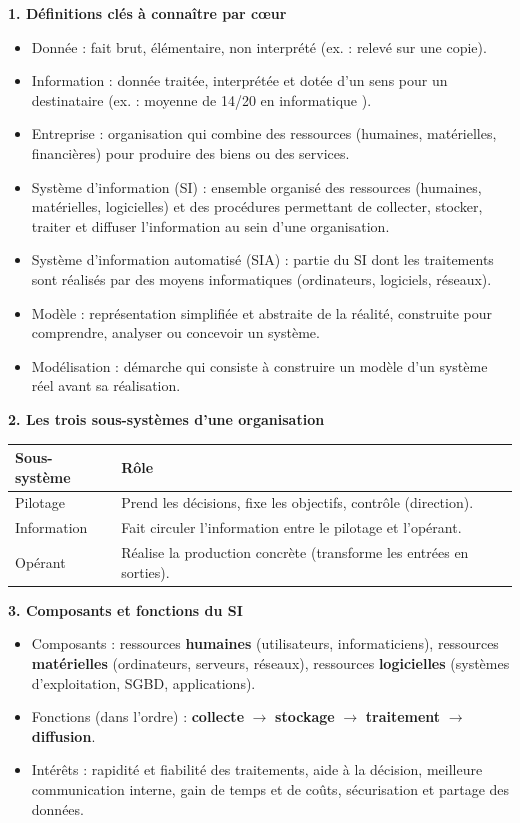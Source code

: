 \documentclass[11pt]{article}
\newcommand{\cle}[1]{{\popxbold\color{popdark}#1}}
\begin{document}
\begin{bilan}
\textbf{1. Définitions clés à connaître par c\oe ur}
\begin{itemize}
  \item \cle{Donnée} : fait brut, élémentaire, non interprété (ex. :  \fg{} relevé sur une copie).
  \item \cle{Information} : donnée traitée, interprétée et dotée d'un sens pour un destinataire (ex. : \og moyenne de 14/20 en informatique \fg).
  \item \cle{Entreprise} : organisation qui combine des ressources (humaines, matérielles, financières) pour produire des biens ou des services.
  \item \cle{Système d'information (SI)} : ensemble organisé des ressources (humaines, matérielles, logicielles) et des procédures permettant de collecter, stocker, traiter et diffuser l'information au sein d'une organisation.
  \item \cle{Système d'information automatisé (SIA)} : partie du SI dont les traitements sont réalisés par des moyens informatiques (ordinateurs, logiciels, réseaux).
  \item \cle{Modèle} : représentation simplifiée et abstraite de la réalité, construite pour comprendre, analyser ou concevoir un système.
  \item \cle{Modélisation} : démarche qui consiste à construire un modèle d'un système réel avant sa réalisation.
\end{itemize}

\textbf{2. Les trois sous-systèmes d'une organisation}
\begin{center}
\begin{tabularx}{\linewidth}{|l|X|}
\hline
\rowcolor{popblueL} \textbf{Sous-système} & \textbf{Rôle} \\
\hline
Pilotage & Prend les décisions, fixe les objectifs, contrôle (direction). \\
\hline
Information & Fait circuler l'information entre le pilotage et l'opérant. \\
\hline
Opérant & Réalise la production concrète (transforme les entrées en sorties). \\
\hline
\end{tabularx}
\end{center}

\textbf{3. Composants et fonctions du SI}
\begin{itemize}
  \item \cle{Composants} : ressources \textbf{humaines} (utilisateurs, informaticiens), ressources \textbf{matérielles} (ordinateurs, serveurs, réseaux), ressources \textbf{logicielles} (systèmes d'exploitation, SGBD, applications).
  \item \cle{Fonctions} (dans l'ordre) : \textbf{collecte} $\rightarrow$ \textbf{stockage} $\rightarrow$ \textbf{traitement} $\rightarrow$ \textbf{diffusion}.
  \item \cle{Intérêts} : rapidité et fiabilité des traitements, aide à la décision, meilleure communication interne, gain de temps et de coûts, sécurisation et partage des données.
\end{itemize}


\end{bilan}
\end{document}
